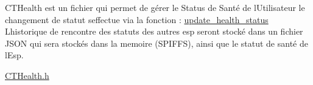 CTHealth est un fichier qui permet de gérer le Status de Santé de l\textquotesingle{}Utilisateur le changement de statut s\textquotesingle{}effectue via la fonction \+: \mbox{\hyperlink{_c_t_health_8h_a784bb1e56b3944a8e081a1f09e27c275}{update\+\_\+health\+\_\+status}} L\textquotesingle{}historique de rencontre des statuts des autres esp seront stocké dans un fichier JSON qui sera stockés dans la memoire (SPIFFS), ainsi que le statut de santé de l\textquotesingle{}Esp.

\mbox{\hyperlink{_c_t_health_8h}{CTHealth.\+h}} 